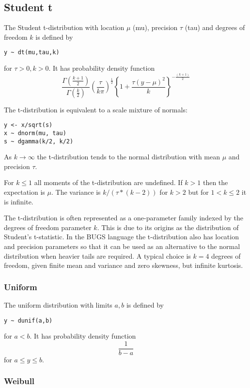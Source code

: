 \documentclass[11pt, a4paper, titlepage]{report}
\begin{document}
\subsection{Student t}
\label{bugs:dt}

The Student t-distribution with location $\mu$ (mu), precision $\tau$
(tau) and degrees of freedom $k$ is defined by
\begin{verbatim}
y ~ dt(mu,tau,k)
\end{verbatim}
for $\tau > 0, k > 0$. It has probability density function
\[
\frac{\Gamma(\frac{k+1}{2})}{\Gamma(\frac{k}{2})} 
\left(\frac{\tau}{k\pi} \right)^{\frac{1}{2}} 
\left\{1 + \frac{\tau (y - \mu)^2}{k} \right\}^{-\frac{(k+1)}{2}}
\]

The t-distribution is equivalent to a scale mixture of normals:
\begin{verbatim}
y <- x/sqrt(s)
x ~ dnorm(mu, tau)
s ~ dgamma(k/2, k/2)
\end{verbatim}
As $k \rightarrow \infty$ the t-distribution tends to the normal distribution
with mean $\mu$ and precision $\tau$.

For $k \leq 1$ all moments of the t-distribution are undefined. If $k
> 1$ then the expectation is $\mu$. The variance is $k/(\tau*(k-2))$
for $k > 2$ but for $1 < k \leq 2$ it is infinite.

The t-distribution is often represented as a one-parameter family
indexed by the degrees of freedom parameter $k$. This is due to its
origins as the distribution of Student's t-statistic. In the BUGS
language the t-distribution also has location and precision parameters
so that it can be used as an alternative to the normal distribution
when heavier tails are required.  A typical choice is $k=4$ degrees of
freedom, given finite mean and variance and zero skewness, but
infinite kurtosis.

\subsubsection{Uniform}
\label{bugs:dunif}

The uniform distribution with limits $a, b$ is defined by
\begin{verbatim}
y ~ dunif(a,b)
\end{verbatim}
for $a < b$. It has probability density function
\[
\frac{\textstyle 1}{\textstyle b - a}
\]
for $a \leq y \leq b$.

\subsubsection{Weibull}
\label{bugs:dweib}
\end{document}
